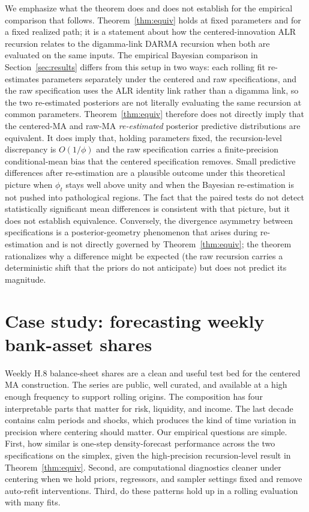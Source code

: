 \documentclass[12pt]{article}
\theoremstyle{remark}
\begin{document}
We emphasize what the theorem does and does not establish for the empirical comparison that follows. Theorem~\ref{thm:equiv} holds at fixed parameters and for a fixed realized path; it is a statement about how the centered-innovation ALR recursion relates to the digamma-link DARMA recursion when both are evaluated on the same inputs. The empirical Bayesian comparison in Section~\ref{sec:results} differs from this setup in two ways: each rolling fit re-estimates parameters separately under the centered and raw specifications, and the raw specification uses the ALR identity link rather than a digamma link, so the two re-estimated posteriors are not literally evaluating the same recursion at common parameters. Theorem~\ref{thm:equiv} therefore does not directly imply that the centered-MA and raw-MA \emph{re-estimated} posterior predictive distributions are equivalent. It does imply that, holding parameters fixed, the recursion-level discrepancy is $O(1/\phi)$ and the raw specification carries a finite-precision conditional-mean bias that the centered specification removes. Small predictive differences after re-estimation are a plausible outcome under this theoretical picture when $\phi_t$ stays well above unity and when the Bayesian re-estimation is not pushed into pathological regions. The fact that the paired tests do not detect statistically significant mean differences is consistent with that picture, but it does not establish equivalence. Conversely, the divergence asymmetry between specifications is a posterior-geometry phenomenon that arises during re-estimation and is not directly governed by Theorem~\ref{thm:equiv}; the theorem rationalizes why a difference might be expected (the raw recursion carries a deterministic shift that the priors do not anticipate) but does not predict its magnitude.

\section{Case study: forecasting weekly bank-asset shares}

Weekly H.8 balance-sheet shares are a clean and useful test bed for the centered MA construction. The series are public, well curated, and available at a high enough frequency to support rolling origins. The composition has four interpretable parts that matter for risk, liquidity, and income. The last decade contains calm periods and shocks, which produces the kind of time variation in precision where centering should matter. Our empirical questions are simple. First, how similar is one-step density-forecast performance across the two specifications on the simplex, given the high-precision recursion-level result in Theorem~\ref{thm:equiv}. Second, are computational diagnostics cleaner under centering when we hold priors, regressors, and sampler settings fixed and remove auto-refit interventions. Third, do these patterns hold up in a rolling evaluation with many fits.
\end{document}

